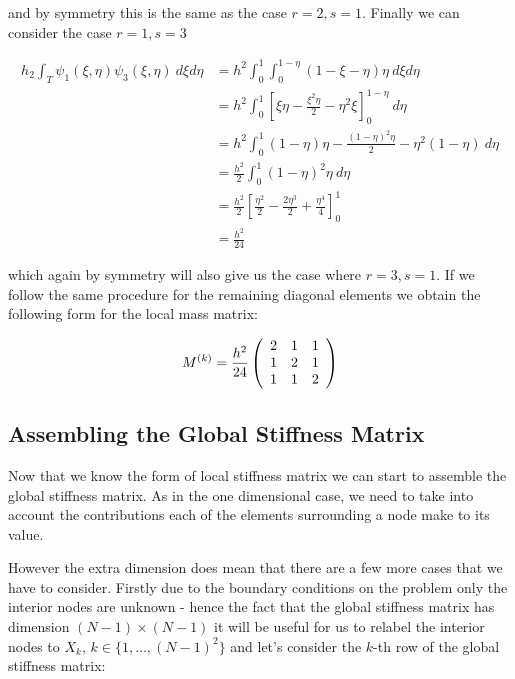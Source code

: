 and by symmetry this is the same as the case $r = 2, s = 1$. Finally we can consider the case
$r = 1, s = 3$

\begin{align*}
    h_2\int_T\psi_1(\xi, \eta)\psi_3(\xi, \eta)\ d\xi d\eta
    &= h^2\int_0^1\int_0^{1-\eta}(1 - \xi - \eta)\eta\ d\xi d\eta \\
    &= h^2\int_0^1\left[\xi\eta - \frac{\xi^2\eta}{2} - \eta^2\xi\right]_0^{1-\eta}\ d\eta \\
    &= h^2\int_0^1(1-\eta)\eta - \frac{(1 - \eta)^2\eta}{2} - \eta^2(1 - \eta)\ d\eta \\
    &= \frac{h^2}{2}\int_0^1(1 - \eta)^2\eta \ d\eta \\
    &= \frac{h^2}{2}\left[\frac{\eta^2}{2} - \frac{2\eta^3}{2} + \frac{\eta^4}{4}\right]_0^1 \\
    &= \frac{h^2}{24}
\end{align*}

which again by symmetry will also give us the case where $r = 3, s = 1$. If we
follow the same procedure for the remaining diagonal elements we obtain the
following form for the local mass matrix:

\begin{equation}\label{eq:twod-local-mass}
    M^{(k)} =
    \frac{h^2}{24}\left(\begin{array}{c c c}
         2 &  1 &  1 \\
         1 &  2 &  1 \\
         1 &  1 &  2
      \end{array}\right)
\end{equation}

\subsection{Assembling the Global Stiffness Matrix}\label{sec:twod-global-stiffnes-assembly}

Now that we know the form of local stiffness matrix
 we can start to assemble the global stiffness
matrix. As in the one dimensional case, we need to take into account the
contributions each of the elements surrounding a node make to its value.

However the extra dimension does mean that there are a few more cases that we
have to consider. Firstly due to the boundary conditions on the problem only
the interior nodes are unknown - hence the fact that the global stiffness
matrix has dimension $(N - 1) \times (N - 1)$ it will be useful for us to
relabel the interior nodes to $X_k$, $k \in \{1, \ldots, (N-1)^2\}$ and let's
consider the $k$-th row of the global stiffness matrix:

